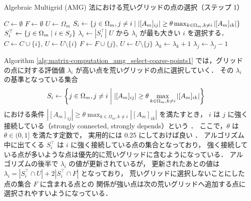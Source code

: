\begin{algorithm}[tp]
    \caption{Algebraic Multigrid (AMG) 法における荒いグリッドの点の選択（ステップ 1） \cite{Ruge1987}}
    \label{alg:matrix-computation_amg_select-coarse-points1}
    \begin{algorithmic}[1]
        \State $C \gets \emptyset$
        \State $F \gets \emptyset$
        \State $U \gets \Omega_m$
        \State $S_i \gets \left\{j \in \Omega_m, j \neq i \relmiddle| %
            \left| [A_m]_{ij} \right| \ge \theta %
            \max_{k \in \Omega_m, k \neq i} \left| [A_m]_{ik} \right| \right\}$
        \Comment{$\theta$ は $\theta \in (0, 1]$ な定数}
        \EndFor
        \State $S_i^\top \gets \left\{ j \in \Omega_m \mathrel{}\middle|\mathrel{} i \in S_j \right\}$
        \State $\lambda_i \gets \left| S_i^\top \right|$
        \EndFor
        \State $U$ から $\lambda_i$ が最も大きい $i$ を選択する．
        \State $C \gets C \cup \{i\}$, $U \gets U \setminus \{i\}$
        \State $F \gets F \cup \{j\}$, $U \gets U \setminus \{j\}$
        \State $\lambda_k \gets \lambda_k + 1$
        \EndFor
        \EndFor
        \State $\lambda_j \gets \lambda_j - 1$
        \EndFor
        \EndWhile
        \EndProcedure
    \end{algorithmic}
\end{algorithm}

Algorithm \ref{alg:matrix-computation_amg_select-coarse-points1}
では，グリッドの点に対する評価値 $\lambda_i$ が高い点を荒いグリッドの点に選択していく．
その $\lambda_i$ の基準となっている集合
\begin{equation}
    S_i \gets \left\{j \in \Omega_m, j \neq i \relmiddle| %
    \left| [A_m]_{ij} \right| \ge \theta %
    \max_{k \in \Omega_m, k \neq i} \left| [A_m]_{ik} \right| \right\}
\end{equation}
における条件
$\left| [A_m]_{ij} \right| \ge \theta %
    \max_{k \in \Omega_m, k \neq i} \left| [A_m]_{ik} \right|$
を満たすとき，
$i$ は $j$ に強く接続している（strongly connected, strongly depends）という
\cite{Ruge1987}．
ここで，$\theta$ は $\theta \in (0, 1]$ を満たす定数で，
実用的には 0.25 にしておけば良い
\cite{Ruge1987}．
アルゴリズム中に出てくる $S_i^\top$ は $i$ に強く接続している点の集合となっており，
強く接続している点が多いような点は優先的に荒いグリッドに含むようになっている．
アルゴリズムの後半で $\lambda_i$ の値が更新されているが，
更新されたあとの値は
$\lambda_i = \left|S_i^\top \cap U\right| + 2 \left|S_i^\top \cap F\right|$
となっており，
荒いグリッドに選択しないことにした点の集合 $F$ に含まれる点との
関係が強い点は次の荒いグリッドへ追加する点に選択されやすいようになっている．

